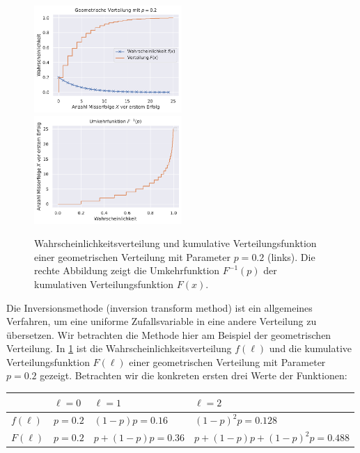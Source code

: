\begin{figure}[t]
    \begin{center}
        \includegraphics[width=0.5\textwidth]{data/geometric-distr.pdf}%
        \includegraphics[width=0.5\textwidth]{data/geometric-distr-inv.pdf}
    \end{center}

    \caption{
        Wahrscheinlichkeitsverteilung und kumulative Verteilungsfunktion einer geometrischen Verteilung mit Parameter $p = 0.2$ (links).
        Die rechte Abbildung zeigt die \glqq Umkehrfunktion\grqq{} $F^{-1}(p)$ der kumulativen Verteilungsfunktion $F(x)$.
    }
    \label{fig:geometric-distr}
\end{figure}

Die  Inversionsmethode (inversion transform method) ist ein allgemeines Verfahren, um eine uniforme Zufallsvariable in eine andere Verteilung zu übersetzen.
Wir betrachten die Methode hier am Beispiel der geometrischen Verteilung.
In \cref{fig:geometric-distr} ist die Wahrscheinlichkeitsverteilung $f(\ell)$ und die kumulative Verteilungsfunktion $F(\ell)$ einer geometrischen Verteilung mit Parameter $p = 0.2$ gezeigt.
%
Betrachten wir die konkreten ersten drei Werte der Funktionen:

\begin{center}
    \begin{tabular}{l|p{}p{}p{}}
                  & $\ell = 0$ & $\ell = 1$              & $\ell = 2$                              \\\hline\hline
        $f(\ell)$ & $p =0.2$   & $(1 {-} p)p = 0.16$     & $(1 {-} p)^2p = 0.128$                  \\
        $F(\ell)$ & $p =0.2$   & $p{+}(1 {-} p)p = 0.36$ & $p{+}(1 {-} p)p{+}(1 {-} p)^2p = 0.488$
    \end{tabular}
\end{center}
\vspace{1em}

